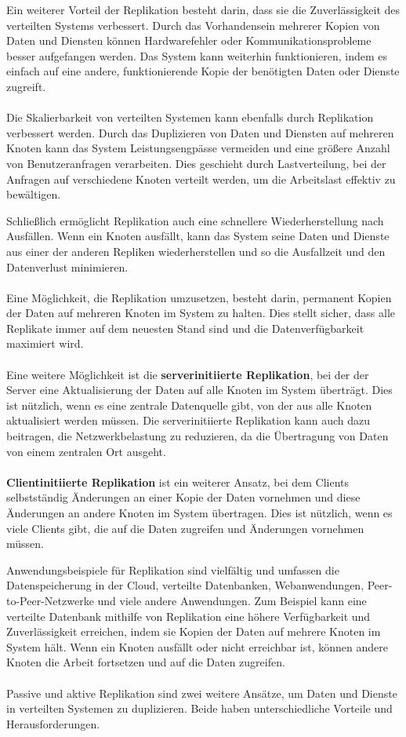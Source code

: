 Ein weiterer Vorteil der Replikation besteht darin, dass sie die Zuverlässigkeit des verteilten Systems verbessert. Durch das Vorhandensein mehrerer Kopien von Daten und Diensten können Hardwarefehler oder Kommunikationsprobleme besser aufgefangen werden. Das System kann weiterhin funktionieren, indem es einfach auf eine andere, funktionierende Kopie der benötigten Daten oder Dienste zugreift.
\\\\
Die Skalierbarkeit von verteilten Systemen kann ebenfalls durch Replikation verbessert werden. Durch das Duplizieren von Daten und Diensten auf mehreren Knoten kann das System Leistungsengpässe vermeiden und eine größere Anzahl von Benutzeranfragen verarbeiten. Dies geschieht durch Lastverteilung, bei der Anfragen auf verschiedene Knoten verteilt werden, um die Arbeitslast effektiv zu bewältigen.

Schließlich ermöglicht Replikation auch eine schnellere Wiederherstellung nach Ausfällen. Wenn ein Knoten ausfällt, kann das System seine Daten und Dienste aus einer der anderen Repliken wiederherstellen und so die Ausfallzeit und den Datenverlust minimieren.
\\\\
Eine Möglichkeit, die Replikation umzusetzen, besteht darin, permanent Kopien der Daten auf mehreren Knoten im System zu halten. Dies stellt sicher, dass alle Replikate immer auf dem neuesten Stand sind und die Datenverfügbarkeit maximiert wird.
\\\\
Eine weitere Möglichkeit ist die \textbf{serverinitiierte Replikation}, bei der der Server eine Aktualisierung der Daten auf alle Knoten im System überträgt. Dies ist nützlich, wenn es eine zentrale Datenquelle gibt, von der aus alle Knoten aktualisiert werden müssen. Die serverinitiierte Replikation kann auch dazu beitragen, die Netzwerkbelastung zu reduzieren, da die Übertragung von Daten von einem zentralen Ort ausgeht.
\\\\
\textbf{Clientinitiierte Replikation} ist ein weiterer Ansatz, bei dem Clients selbstständig Änderungen an einer Kopie der Daten vornehmen und diese Änderungen an andere Knoten im System übertragen. Dies ist nützlich, wenn es viele Clients gibt, die auf die Daten zugreifen und Änderungen vornehmen müssen.

Anwendungsbeispiele für Replikation sind vielfältig und umfassen die Datenspeicherung in der Cloud, verteilte Datenbanken, Webanwendungen, Peer-to-Peer-Netzwerke und viele andere Anwendungen. Zum Beispiel kann eine verteilte Datenbank mithilfe von Replikation eine höhere Verfügbarkeit und Zuverlässigkeit erreichen, indem sie Kopien der Daten auf mehrere Knoten im System hält. Wenn ein Knoten ausfällt oder nicht erreichbar ist, können andere Knoten die Arbeit fortsetzen und auf die Daten zugreifen.
\\\\
Passive und aktive Replikation sind zwei weitere Ansätze, um Daten und Dienste in verteilten Systemen zu duplizieren. Beide haben unterschiedliche Vorteile und Herausforderungen.

